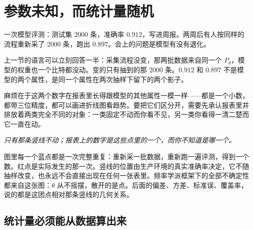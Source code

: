 \section{参数未知，而统计量随机}
\label{sec:11-Mathematical-Statistics/01-Statistical-Models/02}

一次模型评测：测试集 2000 条，准确率 \(0.912\)，写进周报。两周后有人按同样的流程重新采了 2000 条，跑出 \(0.897\)。会上的问题是模型有没有退化。

上一节的语言可以立刻回答一半：采集流程没变，那两批数据来自同一个 \(P_\theta\)，模型的权重也一个比特都没动。变的只有抽到的那 2000 条。\(0.912\) 和 \(0.897\) 不是模型的两个属性，是同一个属性在两次抽样下留下的两个影子。

麻烦在于这两个数字在报表里长得跟模型的其他属性一模一样——都是一个小数，都带三位精度，都可以画进折线图看趋势。要把它们区分开，需要先承认报表里并排放着两类完全不同的对象：一类固定不动而你看不见，另一类你看得一清二楚而它一直在动。

\begin{center}

\emph{只有那条竖线不动；报表上的数字是这些点里的一个，而你不知道是哪一个。}
\end{center}

图里每一个蓝点都是一次完整重复：重新采一批数据，重新跑一遍评测，得到一个数。红点是实际发生的那一次。竖线的位置由生产环境的真实准确率决定，它不随抽样改变，也永远不会直接出现在任何一张表里。频率学派框架下的全部不确定性都来自这张图：\(\theta\) 从不摇摆，散开的是点。后面的偏差、方差、标准误、覆盖率，说的都是这团点相对那条竖线的几何关系。

\subsection{统计量必须能从数据算出来}

